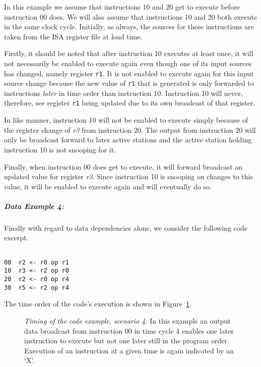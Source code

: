 \documentclass[10pt,dvips]{article}
\begin{document}
In this example we assume that instructions 10 and 20 get to execute
before instruction 00 does.  We will also assume that instructions
10 and 20 both execute in the same clock cycle.
Initially, as always, the sources for these instructions
are taken from the ISA register file at load time.

Firstly, it should be noted that after instruction 10
executes at least once, it will not necessarily be enabled to execute
again even though one of its input sources has changed, namely
register
{\tt r1}.
It is not enabled to execute again for this input source change because
the new value of
{\tt r1}
that is generated is only forwarded to instructions {\it later}
in time order than instruction 10.  
Instruction 10 will never, therefore, see register
{\tt r1}
being updated due to its own broadcast of that register.

In like manner, instruction
10 will not be enabled to execute simply because of the register change
of
{\it r3}
from instruction 20.  The output from instruction 20 will
only be broadcast forward to later active stations and
the active station holding instruction 10 is not snooping for it.

Finally, when instruction 00 does get to execute, it will
forward broadcast an updated value for register
{\it r3}.
Since instruction 10 is snooping on changes to this value,
it will be enabled to execute again and will eventually do so.

\subparagraph{Data Example 4: }
Finally with regard to data dependencies alone, we consider
the following code excerpt.

\begin{verbatim}

00	r2 <- r0 op r1
10	r3 <- r2 op r0
20	r2 <- r0 op r4
30	r5 <- r2 op r4

\end{verbatim}

The time order of the code's execution is shown in
Figure~\ref{ex4}.

\begin{figure}
\centering
{}
\caption{{\em Timing of the code example, scenario 4.}
In this example an output data broadcast from instruction 00
in time cycle 4 enables one later instruction to
execute but not one later still in the program order.
Execution of an instruction at a given time is
again indicated by an `X'.}
\label{ex4}
\end{figure}
\end{document}
